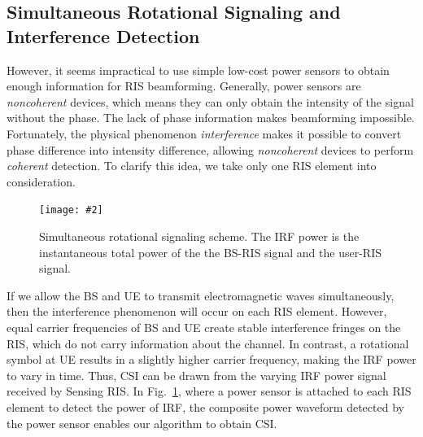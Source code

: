 \documentclass[12pt,draftclsnofoot,journal,onecolumn]{IEEEtran}
\theoremstyle{nonumberplain}
\newcommand{\myincludegraphics}[2][width=12cm]{\texttt{[image: \#2]}}
\begin{document}
\subsection{Simultaneous Rotational Signaling and Interference Detection}
    However, it seems impractical to use simple low-cost power sensors to obtain enough information for RIS beamforming. 
    Generally, power sensors are {\it noncoherent} devices, which means they can only obtain the intensity of the signal without the phase. 
    The lack of phase information makes beamforming impossible. 
    Fortunately, the physical phenomenon {\it interference} makes it possible to convert phase difference into intensity difference, allowing {\it noncoherent} devices to perform {\it coherent} detection. 
    To clarify this idea, we take only one RIS element into consideration.     
    \begin{figure}[!t]
        \centering
        \myincludegraphics{data/protocol.pdf} 
        \caption{Simultaneous rotational signaling scheme. The IRF power is the instantaneous total power of the the BS-RIS signal and the user-RIS signal. }
        \label{fig:protocol}
    \end{figure}
    If we allow the BS and UE to transmit electromagnetic waves simultaneously, then the interference phenomenon will occur on each RIS element. 
    However, equal carrier frequencies of BS and UE create stable interference fringes \cite{louradour1993interference} on the RIS, which do not carry information about the channel. 
    In contrast, a rotational symbol at UE results in a slightly higher carrier frequency, making the IRF power to vary in time. 
    Thus, CSI can be drawn from the varying IRF power signal received by Sensing RIS. 
    In Fig.~\ref{fig:protocol}, where a power sensor is attached to each RIS element to detect the power of \ac{IRF}, the composite power waveform detected by the power sensor enables our algorithm to obtain CSI. 
\end{document}
